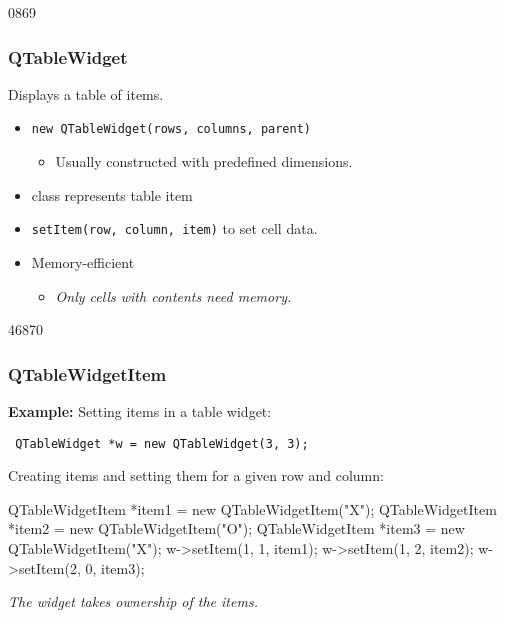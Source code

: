\begin{slide}{0869}\frametitle{QTableWidget}

Displays a table of items.

\begin{itemize}
\item \texttt{new QTableWidget(rows, columns, parent)}
  \begin{itemize}
  \item Usually constructed with predefined dimensions.
  \end{itemize}
\item class  represents table item
\item \texttt{setItem(row, column, item)} to set cell data.
\item Memory-efficient
  \begin{itemize}
  \item \textit{ Only cells with contents need memory.}
  \end{itemize}
\end{itemize}

\vspace*{0.5em}

\end{slide}

\begin{slide}[fragile]{46870}\frametitle{QTableWidgetItem}

\textbf{Example:} Setting items in a table widget:

\vspace*{0.5em}
\begin{lstlisting}
 QTableWidget *w = new QTableWidget(3, 3);
\end{lstlisting}

\vspace*{0.5em}
Creating items and setting them for a given row and column:

\begin{cpp}
QTableWidgetItem *item1 = new QTableWidgetItem("X");
QTableWidgetItem *item2 = new QTableWidgetItem("O");
QTableWidgetItem *item3 = new QTableWidgetItem("X");
w->setItem(1, 1, item1);
w->setItem(1, 2, item2);
w->setItem(2, 0, item3);
\end{cpp}

\vspace*{0.5em}
\textit{The widget takes ownership of the items.}

\vfill
{}
\end{slide}

